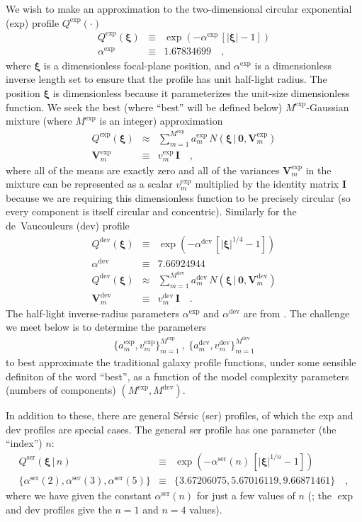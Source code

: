 \documentclass[12pt,pdftex,preprint]{aastex}
\newcommand{\tmatrix}[1]{\boldsymbol{#1}}
\newcommand{\tvector}[1]{\boldsymbol{#1}}
\newcommand{\spos}{\tvector{\xi}}
\newcommand{\var}{\tmatrix{V}}
\newcommand{\zero}{\tmatrix{0}}
\newcommand{\identity}{\tmatrix{I}}
\newcommand{\normal}{N}
\newcommand{\given}{\,|\,}
\newcommand{\dev}{\mathrm{dev}}
\newcommand{\ser}{\mathrm{ser}}
\begin{document}
We wish to make an approximation to the two-dimensional circular
exponential (exp) profile $Q^{\exp}(\cdot)$
\begin{eqnarray}\displaystyle
Q^{\exp}(\spos) &\equiv& \exp(-\alpha^{\exp}\,[|\spos| - 1])
\\
\alpha^{\exp} &\equiv& 1.67834699
\quad ,
\end{eqnarray}
where $\spos$ is a dimensionless focal-plane position, and
$\alpha^{\exp}$ is a dimensionless inverse length set to ensure that
the profile has unit half-light radius.  The position $\spos$ is
dimensionless because it parameterizes the unit-size dimensionless
function.  We seek the best (where ``best'' will be defined below)
$M^{\exp}$-Gaussian mixture (where $M^{\exp}$ is an integer)
approximation
\begin{eqnarray}\displaystyle
Q^{\exp}(\spos) &\approx& \sum_{m=1}^{M^{\exp}} a^{\exp}_m\,\normal(\spos\given\zero,\var^{\exp}_m)
\\
\var^{\exp}_m &\equiv& v^{\exp}_m\,\identity
\quad ,
\end{eqnarray}
where all of the means are exactly zero and all of the variances
$\var^{\exp}_m$ in the mixture can be represented as a scalar
$v^{\exp}_m$ multiplied by the identity matrix $\identity$
because we are requiring this dimensionless function to be precisely
circular (so every component is itself circular and concentric).
Similarly for the de~Vaucouleurs (dev) profile
\begin{eqnarray}\displaystyle
Q^{\dev}(\spos) &\equiv& \exp(-\alpha^{\dev}\,[|\spos|^{1/4} - 1])
\\
\alpha^{\dev} &\equiv& 7.66924944
\\
Q^{\dev}(\spos) &\approx& \sum_{m=1}^{M^{\dev}} a^{\dev}_m\,\normal(\spos\given\zero,\var^{\dev}_m)
\\
\var^{\dev}_m &\equiv& v^{\dev}_m\,\identity
\quad .
\end{eqnarray}
The half-light inverse-radius parameters $\alpha^{\exp}$ and
$\alpha^{\dev}$ are from \citet{ciotti}.  The challenge we
meet below is to determine the parameters
\begin{eqnarray}
\{a^{\exp}_m,v^{\exp}_m\}_{m=1}^{M^{\exp}}~,~\{a^{\dev}_m,v^{\dev}_m\}_{m=1}^{M^{\dev}}
\end{eqnarray}
to best approximate the traditional galaxy profile functions, under
some sensible definiton of the word ``best'', as a function of the
model complexity parameters (numbers of components) $(M^{\exp},
M^{\dev})$.

In addition to these, there are general S\'ersic (ser) profiles, of
which the exp and dev profiles are special cases.  The general ser
profile has one parameter (the ``index'') $n$:
\begin{eqnarray}\displaystyle
Q^{\ser}(\spos\given n) &\equiv& \exp(-\alpha^{\ser}(n)\,[|\spos|^{1/n} - 1])
\\
\{\alpha^{\ser}(2), \alpha^{\ser}(3), \alpha^{\ser}(5)\} &\equiv& \{3.67206075, 5.67016119, 9.66871461\}
\quad ,
\end{eqnarray}
where we have given the constant $\alpha^{\ser}(n)$ for just a few
values of $n$ (\citealt{ciotti}; the $\exp$ and $\dev$ profiles give
the $n=1$ and $n=4$ values).
\end{document}
